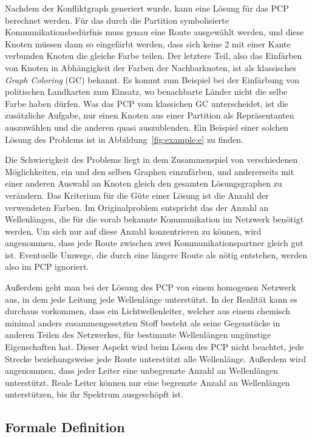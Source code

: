 Nachdem der Konfliktgraph generiert wurde, kann eine Lösung für das PCP berechnet werden. Für das durch die Partition symbolisierte Kommunikationsbedürfnis muss genau eine Route ausgewählt werden, und diese Knoten müssen dann so eingefärbt werden, dass sich keine 2 mit einer Kante verbunden Knoten die gleiche Farbe teilen. Der letztere Teil, also das Einfärben von Knoten in Abhängigkeit der Farben der Nachbarknoten, ist als klassisches \textit{Graph Coloring} (GC) bekannt. Es kommt zum Beispiel bei der Einfärbung von politischen Landkarten zum Einsatz, wo benachbarte Länder nicht die selbe Farbe haben dürfen. Was das PCP vom klassichen GC unterscheidet, ist die zusätzliche Aufgabe, nur einen Knoten aus einer Partition als Repräsentanten auszuwählen und die anderen quasi auszublenden. Ein Beispiel einer solchen Lösung des Problems ist in Abbildung~\ref{fig:example:e} zu finden.

Die Schwierigkeit des Problems liegt in dem Zusammenspiel von verschiedenen Möglichkeiten, ein und den selben Graphen einzufärben, und andererseits mit einer anderen Auswahl an Knoten gleich den gesamten Lösungsgraphen zu verändern. Das Kriterium für die Güte einer Lösung ist die Anzahl der verwendeten Farben. Im Originalproblem entspricht das der Anzahl an Wellenlängen, die für die vorab bekannte Kommunikation im Netzwerk benötigt werden. Um sich nur auf diese Anzahl konzentrieren zu können, wird angenommen, dass jede Route zwischen zwei Kommunikationspartner gleich gut ist. Eventuelle Umwege, die durch eine längere Route als nötig entstehen, werden also im PCP ignoriert. 

Außerdem geht man bei der Lösung des PCP von einem homogenen Netzwerk aus, in dem jede Leitung jede Wellenlänge unterstützt. In der Realität kann es durchaus vorkommen, dass ein Lichtwellenleiter, welcher aus einem chemisch minimal anders zusammengesetzten Stoff besteht als seine Gegenstücke in anderen Teilen des Netzwerkes, für bestimmte Wellenlängen ungünstige Eigenschaften hat. Dieser Aspekt wird beim Lösen des PCP nicht beachtet, jede Strecke beziehungsweise jede Route unterstützt alle Wellenlänge. Außerdem wird angenommen, dass jeder Leiter eine unbegrenzte Anzahl an Wellenlängen unterstützt. Reale Leiter können nur eine begrenzte Anzahl an Wellenlängen unterstützen, bis ihr Spektrum ausgeschöpft ist.

\subsection{Formale Definition}

